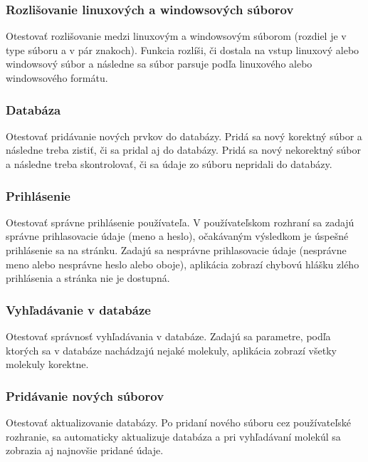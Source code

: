 \documentclass[12pt,a4paper]{article}
\begin{document}
\subsubsection{Rozlišovanie linuxových a windowsových súborov}
Otestovať rozlišovanie medzi linuxovým a windowsovým súborom (rozdiel je v type súboru a v pár znakoch). Funkcia rozlíši, či dostala na vstup linuxový alebo windowsový súbor a následne sa súbor parsuje podľa linuxového alebo windowsového formátu.  

\subsubsection{Databáza}
Otestovať pridávanie nových prvkov do databázy. Pridá sa nový korektný súbor a následne treba zistiť, či sa pridal aj do databázy. Pridá sa nový nekorektný súbor a následne treba skontrolovať, či sa údaje zo súboru nepridali do databázy.

\subsubsection{Prihlásenie}
Otestovať správne prihlásenie používateľa. V používateľskom rozhraní sa zadajú správne prihlasovacie údaje (meno a heslo), očakávaným výsledkom je úspešné prihlásenie sa na stránku. Zadajú sa nesprávne prihlasovacie údaje (nesprávne meno alebo nesprávne heslo alebo oboje), aplikácia zobrazí chybovú hlášku zlého prihlásenia a stránka nie je dostupná.

\subsubsection{Vyhľadávanie v databáze}
Otestovať správnosť vyhľadávania v databáze. Zadajú sa parametre, podľa ktorých sa v databáze nachádzajú nejaké molekuly, aplikácia zobrazí všetky molekuly korektne.

\subsubsection{Pridávanie nových súborov}
Otestovať aktualizovanie databázy. Po pridaní nového súboru cez používateľské rozhranie, sa automaticky aktualizuje databáza a pri vyhľadávaní molekúl sa zobrazia aj najnovšie pridané údaje.
\end{document}
